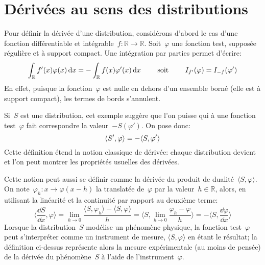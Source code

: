 \medskip
\section{Dérivées au sens des distributions}
Pour définir la dérivée d'une distribution, considérons d'abord le cas d'une fonction différentiable et intégrable~$f:\mathbb{R}\rightarrow\mathbb{R}$.
Soit~$\varphi$ une fonction test, supposée régulière et à support compact.
Une intégration par parties permet d'écrire:
\begin{equation}
  \int_{\mathbb R} f'(x) \varphi(x)\,\text{d} x = -\int_{\mathbb R} f(x)\varphi'(x)\,\text{d} x \qquad\text{ soit }\qquad I_{f'}(\varphi)=I_{-f}(\varphi')
\end{equation}
En effet, puisque la fonction~$\varphi$ est nulle en dehors d'un ensemble borné (elle est à support compact), les termes de bords s'annulent.

\medskip
\begin{definition}
Si~$S$ est une distribution, cet exemple suggère que l'on puisse  qui à une fonction test~$\varphi$ fait correspondre la valeur~$- S(\varphi')$. On pose donc:
\begin{equation}\colorred
  \langle S', \varphi \rangle = - \langle S, \varphi' \rangle
\end{equation}
Cette définition étend la notion classique de dérivée: chaque distribution devient  et l'on peut montrer les propriétés usuelles des dérivées.
\end{definition}

\medskip
Cette notion peut aussi se définir comme la dérivée du produit de dualité~$\langle S,\varphi\rangle$.
On note~$\varphi_h:x\rightarrow\varphi(x-h)$ la translatée de~$\varphi$ par la valeur~$h\in{\mathbb R}$, alors, en utilisant la linéarité et la continuité par rapport au deuxième terme:
\begin{equation}
\langle\frac{\dd S}{\dd x},\varphi\rangle= \lim_{h\rightarrow 0}\frac{ \langle S,\varphi_h\rangle- \langle S,\varphi\rangle}{h}
= \langle S,\lim_{h\rightarrow 0} \frac{\varphi_h-\varphi}{h} \rangle= -\langle S,\frac{\dd\varphi}{\dd x}\rangle
\end{equation}
Lorsque la distribution~$S$ modélise un phénomène physique, la fonction test~$\varphi$ peut s'interpréter comme un instrument de mesure, $\langle S,\varphi\rangle$ en étant le résultat; la définition ci-dessus représente alors la mesure expérimentale (au moins de pensée) de la dérivée du phénomène~$S$ à l'aide de l'instrument~$\varphi$.

